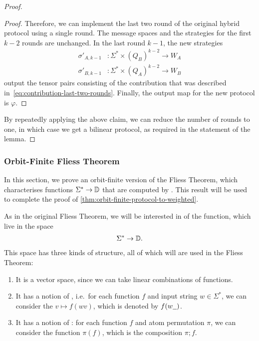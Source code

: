 \begin{proof}
\begin{proof}
        Therefore, we can implement the last two round of the original hybrid protocol using a single round. The message spaces and the strategies for the first $k-2$ rounds are unchanged. In the last round $k-1$, the new strategies
        \begin{align*}
        \sigma'_{A,k-1} & : \Sigma^* \times (Q_B)^{k-2} \to W_A\\
        \sigma'_{B,k-1} & : \Sigma^* \times (Q_A)^{k-2} \to W_B
        \end{align*}
        output the tensor pairs consisting of the contribution that was described in~\eqref{eq:contribution-last-two-rounds}. Finally, the output  map for the new protocol is $\varphi$. 
    \end{proof}

    By repeatedly applying the above claim, we can reduce the number of rounds to one, in which case we get a bilinear protocol, as required in the statement of the lemma. 
\end{proof}


\subsubsection{Orbit-Finite Fliess Theorem}
In this section, we prove an orbit-finite version of the Fliess Theorem, which characterises functions $\Sigma^* \to \mathbb D$ that are computed by . 
This result will be used to complete the proof of \cref{thm:orbit-finite-protocol-to-weighted}.

As in the original Fliess Theorem, we will be interested in  of the function,
which live in the space  
\begin{align*}
\Sigma^* \to \mathbb D.
\end{align*}
This space has three kinds of structure, all of which will are used in the Fliess Theorem: 
\begin{enumerate}
    \item It is a vector space, since we can take linear combinations of functions.
    \item It has a notion of , i.e.~for each function $f$ and input string $w \in \Sigma^*$, we can consider the  $v \mapsto f(wv)$, which is denoted by $f(w\underline{\hspace{2mm}})$.
    \item It has a notion of : for each function $f$ and atom permutation $\pi$, we can consider the function $\pi(f)$, which is the composition $\pi;f$.
\end{enumerate}


